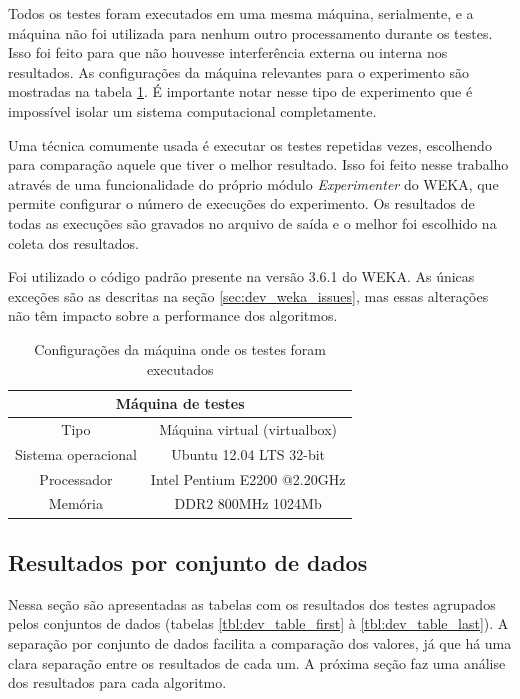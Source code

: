 Todos os testes foram executados em uma mesma máquina, serialmente, e a máquina não foi utilizada para nenhum outro processamento durante os testes. Isso foi feito para que não houvesse interferência externa ou interna nos resultados. As configurações da máquina relevantes para o experimento são mostradas na tabela \ref{tbl:dev_machine_specs}. É importante notar nesse tipo de experimento que é impossível isolar um sistema computacional completamente.

Uma técnica comumente usada é executar os testes repetidas vezes, escolhendo para comparação aquele que tiver o melhor resultado. Isso foi feito nesse trabalho através de uma funcionalidade do próprio módulo \emph{Experimenter} do WEKA, que permite configurar o número de execuções do experimento. Os resultados de todas as execuções são gravados no arquivo de saída e o melhor foi escolhido na coleta dos resultados.

Foi utilizado o código padrão presente na versão 3.6.1 do WEKA. As únicas exceções são as descritas na seção \ref{sec:dev_weka_issues}, mas essas alterações não têm impacto sobre a performance dos algoritmos.

\begin{table}[h]
    \vspace{0.5cm}
    \scriptsize
    \centering
    \caption{Configurações da máquina onde os testes foram executados}
    \label{tbl:dev_machine_specs}
    \vspace{0.5cm}
    \begin{tabular}{c c}
        \multicolumn{2}{c}{\textbf{Máquina de testes}}     \\
        \hline
        Tipo                & Máquina virtual (virtualbox) \\
        Sistema operacional & Ubuntu 12.04 LTS 32-bit      \\
        Processador         & Intel Pentium E2200 @2.20GHz \\
        Memória             & DDR2 800MHz 1024Mb           \\
    \end{tabular}
    \vspace{0.5cm}
\end{table}

\subsection{Resultados por conjunto de dados}

Nessa seção são apresentadas as tabelas com os resultados dos testes agrupados pelos conjuntos de dados (tabelas \ref{tbl:dev_table_first} à \ref{tbl:dev_table_last}). A separação por conjunto de dados facilita a comparação dos valores, já que há uma clara separação entre os resultados de cada um. A próxima seção faz uma análise dos resultados para cada algoritmo.

